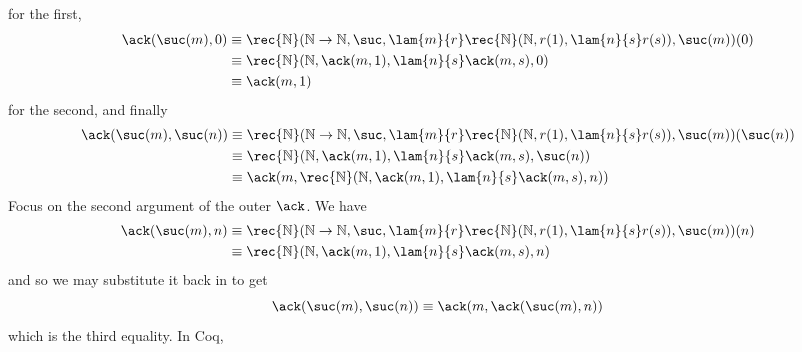 for the first,
\begin{align*}
  \ack(\suc(m), 0)
  &\equiv 
  \rec{\mathbb{N}}(\mathbb{N} \to \mathbb{N}, 
  \suc,
  \lam{m}{r}\rec{\mathbb{N}}(\mathbb{N}, 
                             r(1), 
                             \lam{n}{s}r(s)),
  \suc(m)
  )
  (0)
  \\&\equiv
  \rec{\mathbb{N}}(\mathbb{N}, \ack(m, 1), \lam{n}{s}\ack(m, s), 0)
  \\&\equiv
  \ack(m, 1)
\end{align*}
for the second, and finally
\begin{align*}
  \ack(\suc(m), \suc(n))
  &\equiv 
  \rec{\mathbb{N}}(\mathbb{N} \to \mathbb{N}, 
  \suc,
  \lam{m}{r}\rec{\mathbb{N}}(\mathbb{N}, 
                             r(1), 
                             \lam{n}{s}r(s)),
  \suc(m)
  )
  (\suc(n))
  \\&\equiv
  \rec{\mathbb{N}}(\mathbb{N}, \ack(m, 1), \lam{n}{s}\ack(m, s), \suc(n))
  \\&\equiv
  \ack(m, \rec{\mathbb{N}}(\mathbb{N}, \ack(m, 1), \lam{n}{s}\ack(m, s), n))
\end{align*}
Focus on the second argument of the outer $\ack$.  We have
\begin{align*}
  \ack(\suc(m), n) 
  &\equiv
  \rec{\mathbb{N}}(\mathbb{N} \to \mathbb{N}, 
  \suc,
  \lam{m}{r}\rec{\mathbb{N}}(\mathbb{N}, 
                             r(1), 
                             \lam{n}{s}r(s)),
  \suc(m)
  )
  (n)
  \\&\equiv
  \rec{\mathbb{N}}(\mathbb{N}, \ack(m, 1), \lam{n}{s}\ack(m,s), n)
\end{align*}
and so we may substitute it back in to get
\[
  \ack(\suc(m), \suc(n))
  \equiv
  \ack(m, \ack(\suc(m), n))
\]
which is the third equality.  In Coq,
